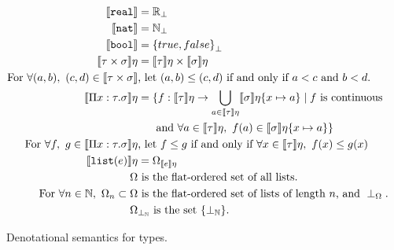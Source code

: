 \begin{figure}
 \begin{align*}
\llbracket \texttt{real} \rrbracket &= \mathbb{R}_{\perp} \\
\llbracket \texttt{nat} \rrbracket &= \mathbb{N}_{\perp} \\
 \llbracket \texttt{bool} \rrbracket &= {\{true, false\}}_{\perp} \\
 \llbracket \tau \times \sigma \rrbracket\eta &= \llbracket \tau \rrbracket\eta \times \llbracket \sigma \rrbracket\eta  \\
 \text{For } \forall (a, b), \ (c, d) \in \llbracket \tau \times \sigma \rrbracket &\text{, let }  (a,b) \leq (c,d) \text{ if and only if } a<c \text{ and } b<d. \\ 
 \llbracket \Pi x:\tau.\sigma \rrbracket\eta &= \{f: \llbracket \tau \rrbracket\eta \rightarrow 
 \bigcup_{a \in \llbracket \tau \rrbracket\eta} \llbracket \sigma \rrbracket\eta\{x \mapsto a\}
 \mid f \text{ is continuous}  \\
 &\text{  \ \ \ \   and } \forall a \in \llbracket \tau \rrbracket\eta, \ f(a) \in \llbracket \sigma\rrbracket\eta\{x\mapsto a\}\} \\
 \text{ For } \forall f, \ g \in \llbracket \Pi x : \tau.\sigma \rrbracket\eta &\text{, let } f \leq g \text{ if and only if } \forall x \in 
 \llbracket \tau \rrbracket\eta, \ f(x) \leq g(x) \\
 \llbracket \texttt{list}(e) \rrbracket\eta &= \Omega_{\llbracket e \rrbracket\eta} \\
 \Omega &\text{ is the flat-ordered set of all lists.} \\
 \text{For } \forall n \in \mathbb{N}, \ \Omega_n \subset \Omega& \text{ is the flat-ordered set of lists of length $n$, and } 
 \perp_{\Omega}. \\
 \Omega&_{\perp_{\mathbb{N}}} \text{ is the set } \{\perp_{\mathbb{N}}\}.
 \end{align*}
 \caption{Denotational semantics for types.}
 \end{figure}
